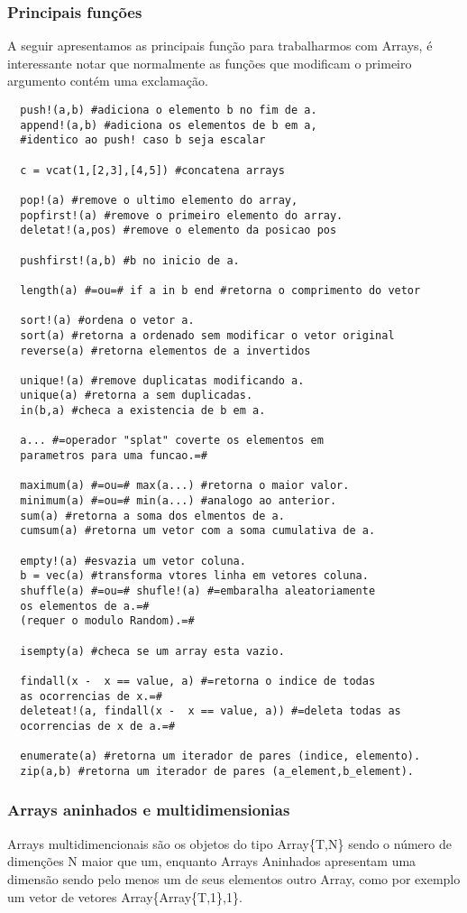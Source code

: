 \subsubsection{Principais funções}
A seguir apresentamos as principais função para trabalharmos com Arrays, é interessante notar que normalmente as funções que modificam o primeiro argumento contém uma exclamação.
\begin{lstlisting}
  push!(a,b) #adiciona o elemento b no fim de a.
  append!(a,b) #adiciona os elementos de b em a,
  #identico ao push! caso b seja escalar

  c = vcat(1,[2,3],[4,5]) #concatena arrays

  pop!(a) #remove o ultimo elemento do array,
  popfirst!(a) #remove o primeiro elemento do array.
  deletat!(a,pos) #remove o elemento da posicao pos

  pushfirst!(a,b) #b no inicio de a.

  length(a) #=ou=# if a in b end #retorna o comprimento do vetor

  sort!(a) #ordena o vetor a.
  sort(a) #retorna a ordenado sem modificar o vetor original
  reverse(a) #retorna elementos de a invertidos

  unique!(a) #remove duplicatas modificando a.
  unique(a) #retorna a sem duplicadas. 
  in(b,a) #checa a existencia de b em a.

  a... #=operador "splat" coverte os elementos em 
  parametros para uma funcao.=#

  maximum(a) #=ou=# max(a...) #retorna o maior valor.
  minimum(a) #=ou=# min(a...) #analogo ao anterior.
  sum(a) #retorna a soma dos elmentos de a.
  cumsum(a) #retorna um vetor com a soma cumulativa de a.

  empty!(a) #esvazia um vetor coluna.
  b = vec(a) #transforma vtores linha em vetores coluna.
  shuffle(a) #=ou=# shufle!(a) #=embaralha aleatoriamente 
  os elementos de a.=# 
  (requer o modulo Random).=#

  isempty(a) #checa se um array esta vazio.

  findall(x -  x == value, a) #=retorna o indice de todas
  as ocorrencias de x.=#
  deleteat!(a, findall(x -  x == value, a)) #=deleta todas as 
  ocorrencias de x de a.=#

  enumerate(a) #retorna um iterador de pares (indice, elemento).
  zip(a,b) #retorna um iterador de pares (a_element,b_element).
\end{lstlisting}

\subsubsection{Arrays aninhados e multidimensionias}
Arrays multidimencionais são os objetos do tipo Array\{T,N\} sendo o número de dimenções N maior que um, enquanto Arrays Aninhados apresentam uma dimensão sendo pelo menos um de seus elementos outro Array, como por exemplo um vetor de vetores Array\{Array\{T,1\},1\}.

